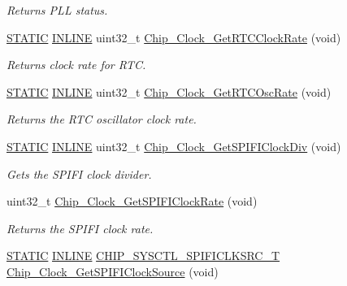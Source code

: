 \begin{DoxyCompactItemize}
\begin{DoxyCompactList}\small\item\em Returns P\+LL status. \end{DoxyCompactList}\item 
\hyperlink{group__LPC__Types__Public__Macros_ga10b2d890d871e1489bb02b7e70d9bdfb}{S\+T\+A\+T\+IC} \hyperlink{group__LPC__Types__Public__Types_ga2eb6f9e0395b47b8d5e3eeae4fe0c116}{I\+N\+L\+I\+NE} uint32\+\_\+t \hyperlink{group__CLOCK__17XX__40XX_ga7c09db016cc48f17aca47d96b0d68814}{Chip\+\_\+\+Clock\+\_\+\+Get\+R\+T\+C\+Clock\+Rate} (void)
\begin{DoxyCompactList}\small\item\em Returns clock rate for R\+TC. \end{DoxyCompactList}\item 
\hyperlink{group__LPC__Types__Public__Macros_ga10b2d890d871e1489bb02b7e70d9bdfb}{S\+T\+A\+T\+IC} \hyperlink{group__LPC__Types__Public__Types_ga2eb6f9e0395b47b8d5e3eeae4fe0c116}{I\+N\+L\+I\+NE} uint32\+\_\+t \hyperlink{group__CLOCK__17XX__40XX_ga64b01351fd2019749b1f1d18dfd263f0}{Chip\+\_\+\+Clock\+\_\+\+Get\+R\+T\+C\+Osc\+Rate} (void)
\begin{DoxyCompactList}\small\item\em Returns the R\+TC oscillator clock rate. \end{DoxyCompactList}\item 
\hyperlink{group__LPC__Types__Public__Macros_ga10b2d890d871e1489bb02b7e70d9bdfb}{S\+T\+A\+T\+IC} \hyperlink{group__LPC__Types__Public__Types_ga2eb6f9e0395b47b8d5e3eeae4fe0c116}{I\+N\+L\+I\+NE} uint32\+\_\+t \hyperlink{group__CLOCK__17XX__40XX_gae658b84de2ea58b38fe7b881a16999a1}{Chip\+\_\+\+Clock\+\_\+\+Get\+S\+P\+I\+F\+I\+Clock\+Div} (void)
\begin{DoxyCompactList}\small\item\em Gets the S\+P\+I\+FI clock divider. \end{DoxyCompactList}\item 
uint32\+\_\+t \hyperlink{group__CLOCK__17XX__40XX_ga09e6d1ff0c53ebffd5f6fd407ea01ddb}{Chip\+\_\+\+Clock\+\_\+\+Get\+S\+P\+I\+F\+I\+Clock\+Rate} (void)
\begin{DoxyCompactList}\small\item\em Returns the S\+P\+I\+FI clock rate. \end{DoxyCompactList}\item 
\hyperlink{group__LPC__Types__Public__Macros_ga10b2d890d871e1489bb02b7e70d9bdfb}{S\+T\+A\+T\+IC} \hyperlink{group__LPC__Types__Public__Types_ga2eb6f9e0395b47b8d5e3eeae4fe0c116}{I\+N\+L\+I\+NE} \hyperlink{group__CLOCK__17XX__40XX_ga55d8797a3b68191ced784240378f74ac}{C\+H\+I\+P\+\_\+\+S\+Y\+S\+C\+T\+L\+\_\+\+S\+P\+I\+F\+I\+C\+L\+K\+S\+R\+C\+\_\+T} \hyperlink{group__CLOCK__17XX__40XX_gad02349cdbc8ced26704cccf06cc57dc6}{Chip\+\_\+\+Clock\+\_\+\+Get\+S\+P\+I\+F\+I\+Clock\+Source} (void)

\end{DoxyCompactItemize}
